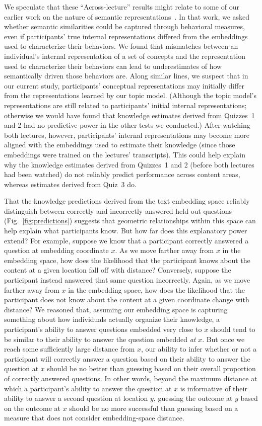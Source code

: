 \documentclass[10pt]{article}
\begin{document}
We speculate that these ``Across-lecture'' results might relate to some of our
earlier work on the nature of semantic representations~\citep{MannKaha12}. In
that work, we asked whether semantic similarities could be captured through
behavioral measures, even if participants' true internal representations
differed from the embeddings used to characterize their behaviors. We
found that mismatches between an individual's internal representation of a set
of concepts and the representation used to characterize their behaviors can lead
to underestimates of how semantically driven those behaviors are. Along similar
lines, we suspect that in our current study, participants' conceptual
representations may initially differ from the representations learned by our
topic model. (Although the topic model's representations are still
related to participants' initial internal representations; otherwise we
would have found that knowledge estimates derived from Quizzes~1 and 2 had no
predictive power in the other tests we conducted.) After watching both lectures,
however, participants' internal representations may become more aligned with the
embeddings used to estimate their knowledge (since those embeddings were trained
on the lectures' transcripts). This could help explain why the knowledge
estimates derived from Quizzes~1 and 2 (before both lectures had been watched)
do not reliably predict performance across content areas, whereas estimates
derived from Quiz~3 do.

That the knowledge predictions derived from the text embedding space reliably
distinguish between correctly and incorrectly answered held-out questions
(Fig.~\ref{fig:predictions}) suggests that geometric relationships within this
space can help explain what participants know. But how far does this
explanatory power extend? For example, suppose we know that a participant
correctly answered a question at embedding coordinate $x$. As we move farther
away from $x$ in the embedding space, how does the likelihood that the
participant knows about the content at a given location fall off with
distance? Conversely, suppose the participant instead answered that same
question incorrectly. Again, as we move farther away from $x$ in the
embedding space, how does the likelihood that the participant does not
know about the content at a given coordinate change with distance? We reasoned that,
assuming our embedding space is capturing something about how individuals
actually organize their knowledge, a participant's ability to answer questions
embedded very close to $x$ should tend to be similar to their ability to answer
the question embedded \textit{at} $x$. But once we
reach some sufficiently large distance from $x$, our ability to infer whether
or not a participant will correctly answer a question based on their ability to
answer the question at $x$ should be no better than guessing based on their
overall proportion of correctly answered questions. In other words,
beyond the maximum distance at which a participant's ability to answer the
question at $x$ is informative of their ability to answer a second question at
location $y$, guessing the outcome at $y$ based on the outcome at $x$ should be no more
successful than guessing based on a measure that does not consider
embedding-space distance.
\end{document}
